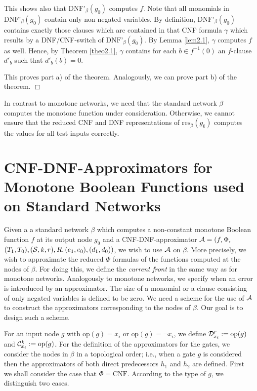 \documentclass[11pt]{article}
\begin{document}
This shows also that $\mbox{DNF'}_{\beta}(g_0)$ computes $f$.
Note that all monomials in $\mbox{DNF'}_{\beta}(g_0)$ contain only non-negated variables. 
By definition, $\mbox{DNF'}_{\beta}(g_0)$ contains exactly those clauses which are contained in that CNF formula
$\gamma$ which results by a DNF/CNF-switch of $\mbox{DNF'}_{\beta}(g_0)$. By Lemma \ref{lem2.1}, $\gamma$ computes
$f$ as well. Hence, by Theorem \ref{theo2.1}, $\gamma$ contains for each $b \in f^{-1}(0)$ an $f$-clause $d'_b$
such that $d'_b(b) = 0$. 

This proves part a) of the theorem. Analogously, we can prove part b) of the theorem.
$\Box$

\smallskip
In contrast to monotone networks, we need that the standard network $\beta$ computes the monotone function 
under consideration. Otherwise, we cannot ensure that the reduced CNF and DNF representations of
$\mbox{res}_{\beta}(g_0)$ computes the values for all test inputs correctly.

\section{CNF-DNF-Approximators for Monotone Boole\-an Functions used on Standard Networks}

Given a a standard network $\beta$ which computes a non-constant monotone Boolean function $f$ at its output node
$g_0$ and a CNF-DNF-approximator ${\cal A} = (f,\Phi,$ $(T_1,T_0),({\cal S},k,r),R,(e_1,e_0),(d_1,d_0))$, we wish
to use ${\cal A}$ on $\beta$. More precisely, we wish to approximate the reduced $\Phi$ formulas of the functions
computed at the nodes of $\beta$.
For doing this, we define the {\em current front} in the same way as for monotone networks. Analogously to
monotone networks, we specify when an error is introduced by an approximator. The size of a monomial or a clause
consisting of only negated variables is defined to be zero.
We need a scheme for the use of ${\cal A}$ to construct the approximators corresponding to the nodes of $\beta$.
Our goal is to design such a scheme.

For an input node $g$ with $\mbox{op}(g) = x_i$ or $\mbox{op}(g) = \neg x_i$, we define
${\cal D}_{x_i}^r := \mbox{op}(g)$ and ${\cal C}_{x_i}^k := \mbox{op}(g)$. For the definition of the approximators
for the gates, we consider the nodes in $\beta$ in a topological order; i.e., when a gate $g$ is considered then
the approximators of both direct predecessors $h_1$ and $h_2$ are defined. 
First we shall consider the case that $\Phi = \mbox{CNF}$. According to the type of $g$, we distinguish two cases.
\end{document}
